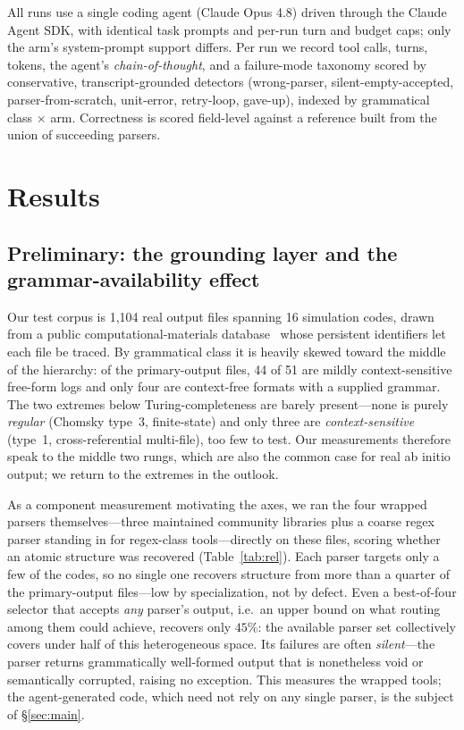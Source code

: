 \documentclass{article}
\newif\ifshowtheme\showthemefalse
\newcommand{\theme}[1]{\ifshowtheme{\normalfont\sffamily\footnotesize\color{gray}[\,#1\,]\ }\fi}
\begin{document}
\theme{instrumentation}All runs use a single coding agent (Claude Opus 4.8) driven
through the Claude Agent SDK, with identical task prompts and per-run turn and budget
caps; only the arm's system-prompt support differs. Per run we record tool calls, turns,
tokens, the agent's \emph{chain-of-thought}, and a failure-mode taxonomy scored by
conservative, transcript-grounded detectors (wrong-parser, silent-empty-accepted,
parser-from-scratch, unit-error, retry-loop, gave-up), indexed by grammatical class
$\times$ arm. Correctness is scored field-level against a reference built from the union
of succeeding parsers.

\section{Results}

\subsection{Preliminary: the grounding layer and the grammar-availability effect}
\label{sec:prelim}

Our test corpus is 1{,}104 real output files spanning 16 simulation codes, drawn from a
public computational-materials database~\citep{draxl2019nomad} whose persistent
identifiers let each file be traced. By grammatical class it is heavily skewed toward the
middle of the hierarchy: of the primary-output files, 44 of 51 are mildly
context-sensitive free-form logs and only four are context-free formats with a supplied
grammar. The two extremes below Turing-completeness are barely present---none is purely
\emph{regular} (Chomsky type~3, finite-state) and only three are \emph{context-sensitive}
(type~1, cross-referential multi-file), too few to test. Our measurements therefore speak
to the middle two rungs, which are also the common case for real ab initio output; we
return to the extremes in the outlook.

As a component measurement motivating the axes, we ran the four wrapped parsers
themselves---three maintained community libraries plus a coarse regex parser standing in
for regex-class tools---directly on these files, scoring whether an atomic structure was
recovered (Table~\ref{tab:rel}). Each parser targets only a few of the codes, so no single
one recovers structure from more than a quarter of the primary-output files---low by
specialization, not by defect. Even a best-of-four selector that accepts \emph{any}
parser's output, i.e.\ an upper bound on what routing among them could achieve, recovers only \(45\%\): the
available parser set collectively covers under half of this heterogeneous space. Its
failures are often \emph{silent}---the parser returns grammatically well-formed output
that is nonetheless void or semantically corrupted, raising no exception. This measures
the wrapped tools; the agent-generated code, which need not rely on any single parser, is
the subject of \S\ref{sec:main}.
\end{document}
